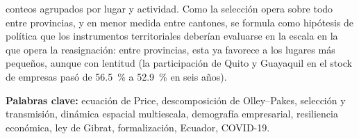 \documentclass[12pt,a4paper]{article}
\begin{document}
conteos agrupados por lugar y actividad. Como la selección opera sobre todo entre provincias, y en menor medida entre cantones, se formula como hipótesis de política que los instrumentos territoriales deberían evaluarse en la escala en la que opera la reasignación: entre provincias, esta ya favorece a los lugares más pequeños, aunque con lentitud (la participación de Quito y Guayaquil en el stock de empresas pasó de 56.5~\% a 52.9~\% en seis años).
\par\vspace{6pt}
\textbf{Palabras clave:} ecuación de Price, descomposición de Olley--Pakes, selección y transmisión, dinámica espacial multiescala, demografía empresarial, resiliencia económica, ley de Gibrat, formalización, Ecuador, COVID-19.
\par
\endgroup
\end{document}
